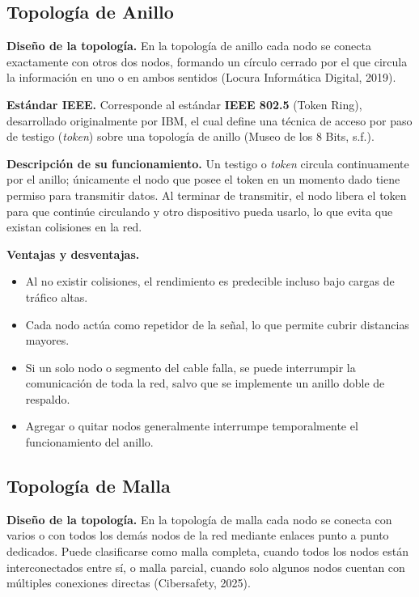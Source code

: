 \documentclass[12pt,letterpaper]{article}
\begin{document}
\subsection{Topología de Anillo}

\textbf{Diseño de la topología.} En la topología de anillo cada nodo se conecta exactamente con otros dos nodos, formando un círculo cerrado por el que circula la información en uno o en ambos sentidos (Locura Informática Digital, 2019).

\textbf{Estándar IEEE.} Corresponde al estándar \textbf{IEEE 802.5} (Token Ring), desarrollado originalmente por IBM, el cual define una técnica de acceso por paso de testigo (\textit{token}) sobre una topología de anillo (Museo de los 8 Bits, s.f.).

\textbf{Descripción de su funcionamiento.} Un testigo o \textit{token} circula continuamente por el anillo; únicamente el nodo que posee el token en un momento dado tiene permiso para transmitir datos. Al terminar de transmitir, el nodo libera el token para que continúe circulando y otro dispositivo pueda usarlo, lo que evita que existan colisiones en la red.

\textbf{Ventajas y desventajas.}
\begin{itemize}[nosep]
    \item[+] Al no existir colisiones, el rendimiento es predecible incluso bajo cargas de tráfico altas.
    \item[+] Cada nodo actúa como repetidor de la señal, lo que permite cubrir distancias mayores.
    \item[$-$] Si un solo nodo o segmento del cable falla, se puede interrumpir la comunicación de toda la red, salvo que se implemente un anillo doble de respaldo.
    \item[$-$] Agregar o quitar nodos generalmente interrumpe temporalmente el funcionamiento del anillo.
\end{itemize}

\subsection{Topología de Malla}

\textbf{Diseño de la topología.} En la topología de malla cada nodo se conecta con varios o con todos los demás nodos de la red mediante enlaces punto a punto dedicados. Puede clasificarse como malla completa, cuando todos los nodos están interconectados entre sí, o malla parcial, cuando solo algunos nodos cuentan con múltiples conexiones directas (Cibersafety, 2025).
\end{document}
